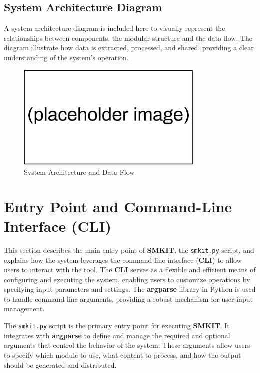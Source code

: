 \subsection{System Architecture Diagram}
\label{subsec:system_architecture_diagram}
A system architecture diagram is included here to visually represent the relationships between components, the modular structure and the data flow. The diagram illustrate how data is extracted, processed, and shared, providing a clear understanding of the system's operation.
\begin{figure}[ht]
        \centering
        \includegraphics[width=0.8\textwidth]{figures/implementation/placeholder_image.png}
        \caption{System Architecture and Data Flow}
        \label{fig:implementation_system_architecture_and_data_flow}
    \end{figure}


\section{Entry Point and Command-Line Interface (CLI)}
\label{sec:entry_point_and_command_line_interface_cli}

This section describes the main entry point of \textbf{SMKIT}, the \texttt{smkit.py} script, and explains how the system leverages the command-line interface (\textbf{CLI}) to allow users to interact with the tool. The \textbf{CLI} serves as a flexible and efficient means of configuring and executing the system, enabling users to customize operations by specifying input parameters and settings. The \textbf{argparse} library in Python is used to handle command-line arguments, providing a robust mechanism for user input management.

The \texttt{smkit.py} script is the primary entry point for executing \textbf{SMKIT}. It integrates with \textbf{argparse} to define and manage the required and optional arguments that control the behavior of the system. These arguments allow users to specify which module to use, what content to process, and how the output should be generated and distributed.

